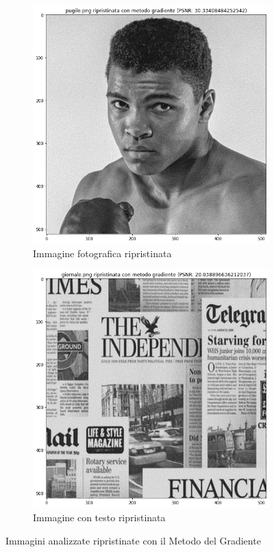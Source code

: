 \begin{figure}[H]
    \begin{subfigure}{0.5\textwidth}
        \centering
        \includegraphics[width=0.6\linewidth]{imgRel/fotogrmg.png}
        \caption{Immagine fotografica ripristinata}
        \label{fig: pugilemg1}
    \end{subfigure}%
    \begin{subfigure}{0.5\textwidth}\centering
        \includegraphics[width=0.6\linewidth]{imgRel/giornalemg.png}
        \caption{Immagine con testo ripristinata}
    \end{subfigure}
\caption{Immagini analizzate ripristinate con il Metodo del Gradiente}
\end{figure}
